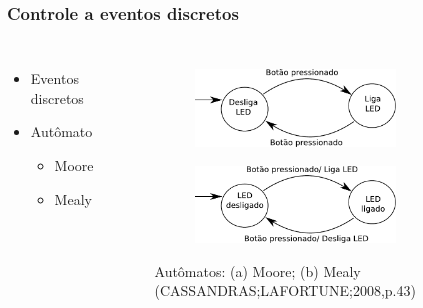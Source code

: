 
\begin{frame}
\frametitle{Controle a eventos discretos}
\begin{columns}
	\begin{itemize}
	\item Eventos discretos
	\item Autômato
		\begin{itemize}
		\item Moore
		\item Mealy
		\end{itemize}
	\end{itemize}
	
	\begin{figure}[h]
     \centering
     \captionsetup{width=0.85\textwidth,font=footnotesize,textfont=bf}
     \begin{subfigure}[b]{\textwidth}
 	\centering
         \includegraphics[width=0.85\textwidth,height=\textheight,keepaspectratio]{Figuras/moore.pdf}
         \caption{\centering \label{fig:moore}}
     \end{subfigure}
     
     \begin{subfigure}[b]{\textwidth}
 	\centering
         \includegraphics[width=0.85\textwidth,height=5\textheight,keepaspectratio]{Figuras/mealy.pdf}
         \caption{\centering \label{fig:mealy}}
     \end{subfigure}
	\caption{Autômatos: (a) Moore; (b) Mealy (CASSANDRAS;LAFORTUNE;2008,p.43)}
 \end{figure}
	
\end{columns}
\end{frame}

















